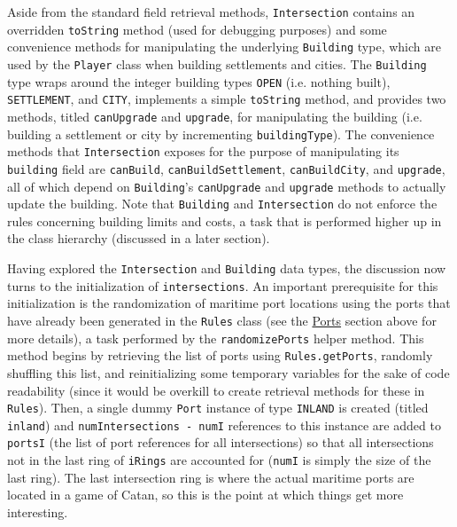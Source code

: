 \documentclass[pageno]{jpaper}
\begin{document}
\begin{doublespacing}
Aside from the standard field retrieval methods, \lstinline$Intersection$ contains an overridden \lstinline$toString$ method (used for debugging purposes) and some convenience methods for manipulating the underlying \lstinline$Building$ type, which are used by the \lstinline$Player$ class when building settlements and cities. The \lstinline$Building$ type wraps around the integer building types \lstinline$OPEN$ (i.e. nothing built), \lstinline$SETTLEMENT$, and \lstinline$CITY$, implements a simple \lstinline$toString$ method, and provides two methods, titled \lstinline$canUpgrade$ and \lstinline$upgrade$, for manipulating the building (i.e. building a settlement or city by incrementing \lstinline$buildingType$). The convenience methods that \lstinline$Intersection$ exposes for the purpose of manipulating its \lstinline$building$ field are \lstinline$canBuild$, \lstinline$canBuildSettlement$, \lstinline$canBuildCity$, and \lstinline$upgrade$, all of which depend on \lstinline$Building$'s \lstinline$canUpgrade$ and \lstinline$upgrade$ methods to actually update the building. Note that \lstinline$Building$ and \lstinline$Intersection$ do not enforce the rules concerning building limits and costs, a task that is performed higher up in the class hierarchy (discussed in a later section).

Having explored the \lstinline$Intersection$ and \lstinline$Building$ data types, the discussion now turns to the initialization of \lstinline$intersections$. An important prerequisite for this initialization is the randomization of maritime port locations using the ports that have already been generated in the \lstinline$Rules$ class (see the \hyperlink{sec:ports}{Ports} section above for more details), a task performed by the \lstinline$randomizePorts$ helper method. This method begins by retrieving the list of ports using \lstinline$Rules.getPorts$, randomly shuffling this list, and reinitializing some temporary variables for the sake of code readability (since it would be overkill to create retrieval methods for these in \lstinline$Rules$). Then, a single dummy \lstinline$Port$ instance of type \lstinline$INLAND$ is created (titled \lstinline$inland$) and \lstinline$numIntersections - numI$ references to this instance are added to \lstinline$portsI$ (the list of port references for all intersections) so that all intersections not in the last ring of \lstinline$iRings$ are accounted for (\lstinline$numI$ is simply the size of the last ring). The last intersection ring is where the actual maritime ports are located in a game of Catan, so this is the point at which things get more interesting.


\end{doublespacing}
\end{document}
